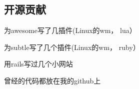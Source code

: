 \documentclass[titlepage]{article}
\begin{document}
\subsection{开源贡献}

\begin{compactitem}
    \item 为awesome写了几插件(Linux的wm， lua）
    \item 为subtle写了几个插件(Linux的wm， ruby）
    \item 用rails写过几个小网站
    \item 曾经的代码都放在我的github上
\end{compactitem}
\end{document}
